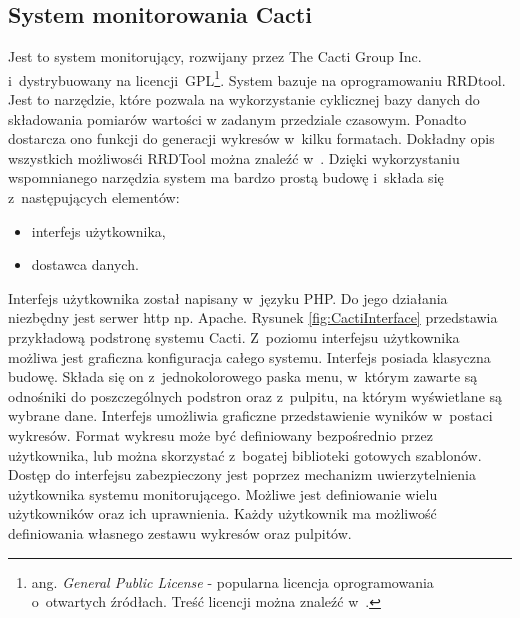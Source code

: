 \subsection[Cacti][System monitorowania Cacti]{System monitorowania Cacti}

Jest to system monitorujący, rozwijany przez The Cacti Group
Inc. i~dystrybuowany na licencji~GPL\footnote{ ang. {\em General
    Public License} - popularna licencja oprogramowania o~otwartych
  źródłach. Treść licencji można znaleźć w~\cite{www:GPLv2}.}. System
bazuje na oprogramowaniu RRDtool. Jest to narzędzie, które pozwala na
wykorzystanie cyklicznej bazy danych do składowania pomiarów wartości
w zadanym przedziale czasowym. Ponadto dostarcza ono funkcji do
generacji wykresów w~kilku formatach. Dokładny opis wszystkich
możliwosći RRDTool można znaleźć w~\cite{www:RRDtool}. Dzięki
wykorzystaniu wspomnianego narzędzia system ma bardzo prostą budowę
i~składa się z~następujących elementów:

\begin{itemize}
\item interfejs użytkownika,
\item dostawca danych.
\end{itemize}

Interfejs użytkownika został napisany w~języku PHP. Do jego działania
niezbędny jest serwer http np. Apache. Rysunek
\ref{fig:CactiInterface} przedstawia przykładową podstronę systemu
Cacti. Z~poziomu interfejsu użytkownika możliwa jest graficzna
konfiguracja całego systemu. Interfejs posiada klasyczna
budowę. Składa się on z~jednokolorowego paska menu, w~którym zawarte
są odnośniki do poszczególnych podstron oraz z~pulpitu, na którym
wyświetlane są wybrane dane. Interfejs umożliwia graficzne
przedstawienie wyników w~postaci wykresów. Format wykresu może być
definiowany bezpośrednio przez użytkownika, lub można skorzystać
z~bogatej biblioteki gotowych szablonów. Dostęp do interfejsu
zabezpieczony jest poprzez mechanizm uwierzytelnienia użytkownika
systemu monitorującego. Możliwe jest definiowanie wielu użytkowników
oraz ich uprawnienia. Każdy użytkownik ma możliwość definiowania
własnego zestawu wykresów oraz pulpitów.


